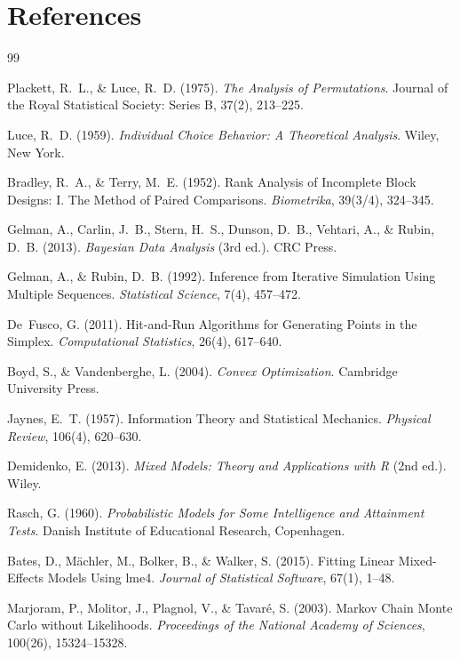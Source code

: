 \documentclass{article}
\begin{document}
\section*{References}
\begin{thebibliography}{99}

Plackett, R.~L., \& Luce, R.~D. (1975).
\emph{The Analysis of Permutations}.
Journal of the Royal Statistical Society: Series B, 37(2), 213--225.

Luce, R.~D. (1959).
\emph{Individual Choice Behavior: A Theoretical Analysis}.
Wiley, New York.

Bradley, R.~A., \& Terry, M.~E. (1952).
Rank Analysis of Incomplete Block Designs: I. The Method of Paired Comparisons.
\emph{Biometrika}, 39(3/4), 324--345.

Gelman, A., Carlin, J.~B., Stern, H.~S., Dunson, D.~B., Vehtari, A., \& Rubin, D.~B. (2013).
\emph{Bayesian Data Analysis} (3rd ed.).
CRC Press.

Gelman, A., \& Rubin, D.~B. (1992).
Inference from Iterative Simulation Using Multiple Sequences.
\emph{Statistical Science}, 7(4), 457--472.

De~Fusco, G. (2011).
Hit-and-Run Algorithms for Generating Points in the Simplex.
\emph{Computational Statistics}, 26(4), 617--640.

Boyd, S., \& Vandenberghe, L. (2004).
\emph{Convex Optimization}.
Cambridge University Press.

Jaynes, E.~T. (1957).
Information Theory and Statistical Mechanics.
\emph{Physical Review}, 106(4), 620--630.

Demidenko, E. (2013).
\emph{Mixed Models: Theory and Applications with R} (2nd ed.).
Wiley.

Rasch, G. (1960).
\emph{Probabilistic Models for Some Intelligence and Attainment Tests}.
Danish Institute of Educational Research, Copenhagen.

Bates, D., M\"achler, M., Bolker, B., \& Walker, S. (2015).
Fitting Linear Mixed-Effects Models Using lme4.
\emph{Journal of Statistical Software}, 67(1), 1--48.

Marjoram, P., Molitor, J., Plagnol, V., \& Tavar\'e, S. (2003).
Markov Chain Monte Carlo without Likelihoods.
\emph{Proceedings of the National Academy of Sciences}, 100(26), 15324--15328.


\end{thebibliography}
\end{document}
